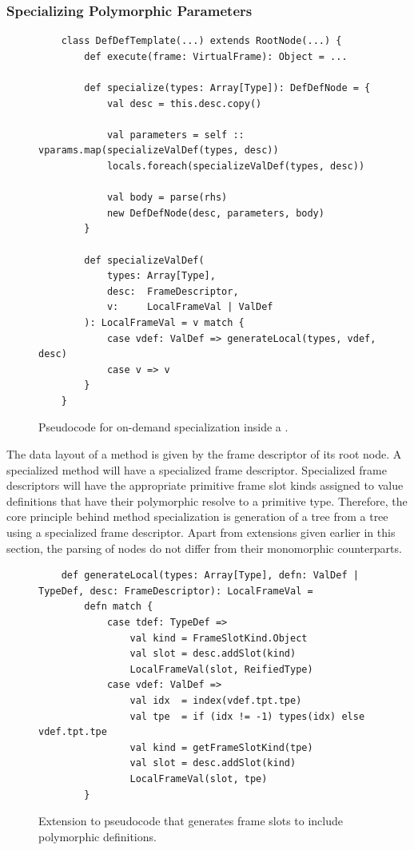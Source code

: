 \subsubsection*{Specializing Polymorphic Parameters}
\begin{figure}[!htb]
	\begin{verbatim}
	class DefDefTemplate(...) extends RootNode(...) {
		def execute(frame: VirtualFrame): Object = ...
			
		def specialize(types: Array[Type]): DefDefNode = {
			val desc = this.desc.copy()
				
			val parameters = self :: vparams.map(specializeValDef(types, desc))
			locals.foreach(specializeValDef(types, desc))
				
			val body = parse(rhs)
			new DefDefNode(desc, parameters, body)
		}
	
		def specializeValDef(
			types: Array[Type], 
			desc:  FrameDescriptor, 
			v:     LocalFrameVal | ValDef
		): LocalFrameVal = v match {
			case vdef: ValDef => generateLocal(types, vdef, desc)
			case v => v
		}
	}
	\end{verbatim}
	\caption{Pseudocode for on-demand specialization inside a .}
	\label{impl:defdeftemplate-specialize}
\end{figure}

The data layout of a method is given by the frame descriptor of its root node.
A specialized method will have a specialized frame descriptor.
Specialized frame descriptors will have the appropriate primitive frame slot kinds assigned to value definitions that have their polymorphic resolve to a primitive type.
Therefore, the core principle behind method specialization is generation of a  tree from a  tree using a specialized frame descriptor.
Apart from extensions given earlier in this section, the parsing of  nodes do not differ from their monomorphic counterparts.

\begin{figure}[!htb]
	\begin{verbatim}
	def generateLocal(types: Array[Type], defn: ValDef | TypeDef, desc: FrameDescriptor): LocalFrameVal = 
		defn match {
			case tdef: TypeDef => 
				val kind = FrameSlotKind.Object
				val slot = desc.addSlot(kind)
				LocalFrameVal(slot, ReifiedType)
			case vdef: ValDef => 
				val idx  = index(vdef.tpt.tpe)
				val tpe  = if (idx != -1) types(idx) else vdef.tpt.tpe
				val kind = getFrameSlotKind(tpe)
				val slot = desc.addSlot(kind)
				LocalFrameVal(slot, tpe)
		}
	\end{verbatim}
	\caption{Extension to pseudocode that generates frame slots to include polymorphic definitions.}
	\label{impl:gen-poly-locals}
\end{figure}

